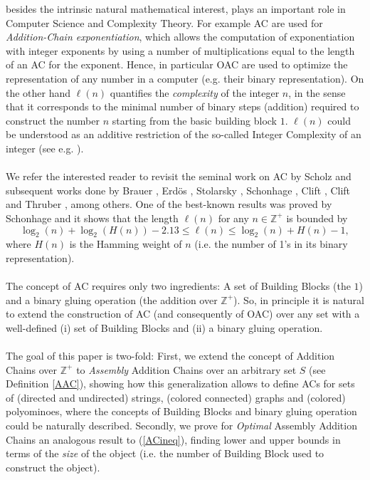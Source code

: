 \documentclass[letterpaper,12pt]{article}
\theoremstyle{definition}
\begin{document}
besides the intrinsic natural mathematical interest, plays an important role in Computer Science and Complexity Theory. For example AC are used for \textit{Addition-Chain exponentiation}, which allows the computation of exponentiation with integer exponents by using a number of multiplications equal to the length of an AC for the exponent. Hence, in particular OAC are used to optimize the representation of any number in a computer (e.g. their binary representation). On the other hand $\ell(n)$ quantifies the \textit{complexity} of the integer $n$, in the sense that it corresponds to the minimal number of binary steps (addition) required to construct the number $n$ starting from the basic building block $1$. $\ell(n)$ could be understood as an additive restriction of the so-called Integer Complexity of an integer (see e.g. \cite{altman2015integer}). 
\\\\
We refer the interested reader to revisit the seminal work on AC by Scholz \cite{Scholz} and subsequent works done by Brauer \cite{brau}, Erd\"{o}s \cite{erdos1960remarks}, Stolarsky \cite{Stolarsky_1969}, Schonhage \cite{SCHONHAGE19751}, Clift \cite{clift}, Clift and Thruber \cite{THURBER2021112200}, among others. One of the best-known results was proved by Schonhage \cite{SCHONHAGE19751} and it shows that the length $\ell(n)$ for any $n \in \mathbb{Z}^+$ is bounded by       
\begin{equation}\label{ACineq}
     \log_2(n) + \log_2(H(n))-2.13 \leq \ell(n) \leq \log_2(n) + H(n)-1,
\end{equation}
where $H(n)$ is the Hamming weight of $n$ (i.e. the number of 1's in its binary representation). \\\\
The concept of AC requires only two ingredients: A set of Building Blocks (the $1$) and a binary gluing operation (the addition over $\mathbb{Z}^+$). So, in principle it is natural to extend the construction of AC (and consequently of OAC) over any set with a well-defined (i) set of Building Blocks and (ii) a binary gluing operation. \\\\
The goal of this paper is two-fold: First, we extend the concept of Addition Chains over $\mathbb{Z}^+$ to \textit{Assembly} Addition Chains over an arbitrary set $S$ (see Definition \ref{AAC}), showing how this generalization allows to define ACs for sets of (directed and undirected) strings, (colored connected) graphs and (colored) polyominoes, where the concepts of Building Blocks and binary gluing operation could be naturally described. Secondly, we prove for \textit{Optimal} Assembly Addition Chains an analogous result to (\ref{ACineq}), finding lower and upper bounds in terms of the \textit{size} of the object (i.e. the number of Building Block used to construct the object).\\\\
\end{document}
